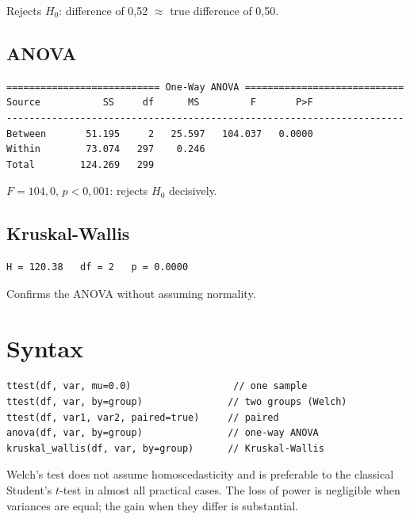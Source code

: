 Rejects $H_0$: difference of 0{,}52 $\approx$ true difference of 0{,}50.

\subsection*{ANOVA}

\begin{lstlisting}[language={}, basicstyle=\ttfamily\small, frame=none,
  numbers=none, backgroundcolor=\color{codbg}]
=========================== One-Way ANOVA ============================
Source           SS     df      MS         F       P>F
----------------------------------------------------------------------
Between       51.195     2   25.597   104.037   0.0000
Within        73.074   297    0.246
Total        124.269   299
\end{lstlisting}

$F = 104{,}0$, $p < 0{,}001$: rejects $H_0$ decisively.

\subsection*{Kruskal-Wallis}

\begin{lstlisting}[language={}, basicstyle=\ttfamily\small, frame=none,
  numbers=none, backgroundcolor=\color{codbg}]
H = 120.38   df = 2   p = 0.0000
\end{lstlisting}

Confirms the ANOVA without assuming normality.

\section{Syntax}

\begin{lstlisting}
ttest(df, var, mu=0.0)                  // one sample
ttest(df, var, by=group)               // two groups (Welch)
ttest(df, var1, var2, paired=true)     // paired
anova(df, var, by=group)               // one-way ANOVA
kruskal_wallis(df, var, by=group)      // Kruskal-Wallis
\end{lstlisting}

\begin{nota}
  Welch's test does not assume homoscedasticity and is preferable to the
  classical Student's $t$-test in almost all practical cases. The loss of power
  is negligible when variances are equal; the gain when they differ
  is substantial.
\end{nota}

